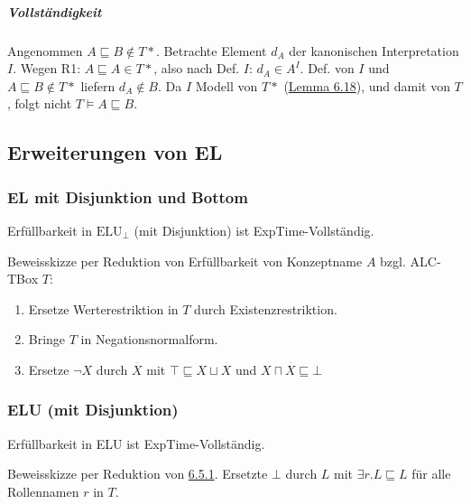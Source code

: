 \subparagraph{Vollständigkeit}\label{vollstuxe4ndigkeit-2}

Angenommen $A \sqsubseteq B \notin T*$. Betrachte Element $d_{A}$
der kanonischen Interpretation $I$. Wegen R1:
$A \sqsubseteq A \in T*$, also nach Def. $I$: $d_{A} \in A^{I}$.
Def. von $I$ und $A \sqsubseteq B \notin T*$ liefern
$d_{A} \notin B$. Da $I$ Modell von $T*$
(\protect\hyperlink{lemma-6.18}{Lemma 6.18}), und damit von $T$, folgt
nicht $T \models A \sqsubseteq B$.

\subsection{Erweiterungen von EL}\label{erweiterungen-von-el}

\hypertarget{el-mit-disjunktion-und-bottom}{\subsubsection{EL mit
Disjunktion und Bottom}\label{el-mit-disjunktion-und-bottom}}

Erfüllbarkeit in $\text{ELU}_{\bot}$ (mit Disjunktion) ist
ExpTime-Vollständig.

Beweisskizze per Reduktion von Erfüllbarkeit von Konzeptname $A$ bzgl.
ALC-TBox $T$:

\begin{enumerate}
\def\labelenumi{\arabic{enumi}.}
\item
  Ersetze Werterestriktion in $T$ durch Existenzrestriktion.
\item
  Bringe $T$ in Negationsnormalform.
\item
  Ersetze $\neg X$ durch $\overset{\overline{}}{X}$ mit
  $\top \sqsubseteq X \sqcup \overset{\overline{}}{X}$ und
  $X \sqcap \overset{\overline{}}{X} \sqsubseteq \bot$
\end{enumerate}

\subsubsection{ELU (mit Disjunktion)}\label{elu-mit-disjunktion}

Erfüllbarkeit in ELU ist ExpTime-Vollständig.

Beweisskizze per Reduktion von
\protect\hyperlink{el-mit-disjunktion-und-bottom}{6.5.1}. Ersetzte
$\bot$ durch $L$ mit $\exists r.L \sqsubseteq L$ für alle
Rollennamen $r$ in $T$.
